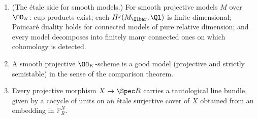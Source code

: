 \begin{proposition}
\begin{enumerate}[label=\textup{(\alph*)},leftmargin=2.2em]
  the package; and, for a tied package, a representation $r\colon\Gal(\Qlbar/K)\to\GL_d(\Ql)$ admissible
  for the package becomes crystalline, in the sense of the package, after extension of scalars to any
  finite extension $L/\Ql$.
\item (The \'etale side for smooth models.) For smooth projective models $M$ over $\OO_K$: cup
  products exist; each $H^j(M_{\Qlbar},\Ql)$ is finite-dimensional; Poincar\'e duality holds for
  connected models of pure relative dimension; and every model decomposes into finitely many
  connected ones on which cohomology is detected.
\item A smooth projective $\OO_K$-scheme is a good model (projective and strictly semistable) in the
  sense of the comparison theorem.
\item Every projective morphism $X\to\Spec R$ carries a tautological line bundle, given by a cocycle of
  units on an \'etale surjective cover of $X$ obtained from an embedding in $\mathbb P^N_R$.
\end{enumerate}
\end{proposition}

